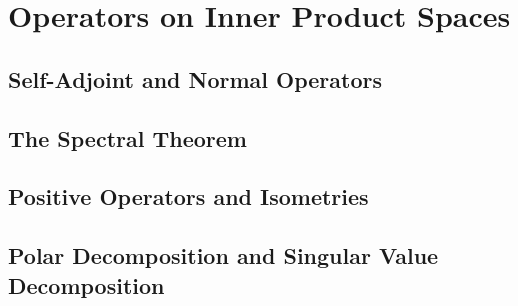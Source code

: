 \chapter{Operators on Inner Product Spaces}

\section{\label{7.A} Self-Adjoint and Normal Operators}

\section{\label{7.B} The Spectral Theorem}

\section{\label{7.C} Positive Operators and Isometries}

\section{\label{7.D} Polar Decomposition and Singular Value Decomposition}